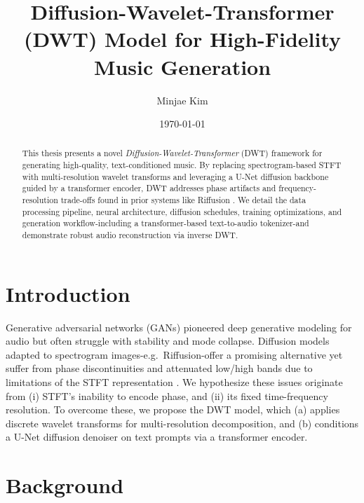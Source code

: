\documentclass[12pt]{report}
\begin{document}
\title{Diffusion-Wavelet-Transformer (DWT) Model for High-Fidelity Music Generation}
\author{Minjae Kim}
\date{\today}
\maketitle

\begin{abstract}
This thesis presents a novel \emph{Diffusion-Wavelet-Transformer} (DWT) framework for generating high-quality, text-conditioned music. By replacing spectrogram-based STFT with multi-resolution wavelet transforms and leveraging a U-Net diffusion backbone guided by a transformer encoder, DWT addresses phase artifacts and frequency-resolution trade-offs found in prior systems like Riffusion \cite{ForsgrenMartiros2022,Rombach2022}. We detail the data processing pipeline, neural architecture, diffusion schedules, training optimizations, and generation workflow-including a transformer-based text-to-audio tokenizer-and demonstrate robust audio reconstruction via inverse DWT.
\end{abstract}

\tableofcontents

\chapter{Introduction}

Generative adversarial networks (GANs) pioneered deep generative modeling for audio \cite{Goodfellow2014} but often struggle with stability and mode collapse. Diffusion models adapted to spectrogram images-e.g.\ Riffusion-offer a promising alternative yet suffer from phase discontinuities and attenuated low/high bands due to limitations of the STFT representation \cite{ForsgrenMartiros2022}\cite{Rombach2022}. We hypothesize these issues originate from (i) STFT’s inability to encode phase, and (ii) its fixed time-frequency resolution. To overcome these, we propose the DWT model, which (a) applies discrete wavelet transforms for multi-resolution decomposition, and (b) conditions a U-Net diffusion denoiser on text prompts via a transformer encoder.

\chapter{Background}
\end{document}
